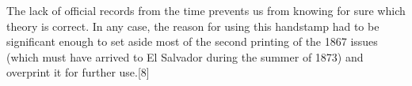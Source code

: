 The lack of official records from the time prevents us from knowing for sure which theory is correct. In any case, the reason for using this handstamp had to be significant enough to set aside most of the second printing of the 1867 issues (which must have arrived to El Salvador during the summer of 1873) and overprint it for further use.[8]









      
